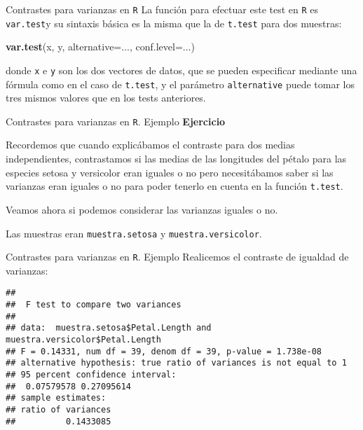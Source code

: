 \documentclass[
  ignorenonframetext,
]{beamer}
\newenvironment{Shaded}{\begin{snugshade}}{\end{snugshade}}
\newcommand{\DataTypeTok}[1]{\textcolor[rgb]{0.13,0.29,0.53}{#1}}
\newcommand{\KeywordTok}[1]{\textcolor[rgb]{0.13,0.29,0.53}{\textbf{#1}}}
\newcommand{\NormalTok}[1]{#1}
\newcommand{\OperatorTok}[1]{\textcolor[rgb]{0.81,0.36,0.00}{\textbf{#1}}}
\begin{document}
\begin{frame}[fragile]{Contrastes para varianzas en \texttt{R}}
\protect\hypertarget{contrastes-para-varianzas-en-r}{}
La función para efectuar este test en \texttt{R} es \texttt{var.test}y
su sintaxis básica es la misma que la de \texttt{t.test} para dos
muestras:

\begin{Shaded}
\begin{Highlighting}[]
\KeywordTok{var.test}\NormalTok{(x, y, }\DataTypeTok{alternative=}\NormalTok{..., }\DataTypeTok{conf.level=}\NormalTok{...)}
\end{Highlighting}
\end{Shaded}

donde \texttt{x} e \texttt{y} son los dos vectores de datos, que se
pueden especificar mediante una fórmula como en el caso de
\texttt{t.test}, y el parámetro \texttt{alternative} puede tomar los
tres mismos valores que en los tests anteriores.
\end{frame}

\begin{frame}[fragile]{Contrastes para varianzas en \texttt{R}. Ejemplo}
\protect\hypertarget{contrastes-para-varianzas-en-r.-ejemplo}{}
\textbf{Ejercicio}

Recordemos que cuando explicábamos el contraste para dos medias
independientes, contrastamos si las medias de las longitudes del pétalo
para las especies setosa y versicolor eran iguales o no pero
necesitábamos saber si las varianzas eran iguales o no para poder
tenerlo en cuenta en la función \texttt{t.test}.

Veamos ahora si podemos considerar las varianzas iguales o no.

Las muestras eran \texttt{muestra.setosa} y \texttt{muestra.versicolor}.
\end{frame}

\begin{frame}[fragile]{Contrastes para varianzas en \texttt{R}. Ejemplo}
\protect\hypertarget{contrastes-para-varianzas-en-r.-ejemplo-1}{}
Realicemos el contraste de igualdad de varianzas:

\begin{Shaded}
\end{Shaded}

\begin{verbatim}
## 
##  F test to compare two variances
## 
## data:  muestra.setosa$Petal.Length and muestra.versicolor$Petal.Length
## F = 0.14331, num df = 39, denom df = 39, p-value = 1.738e-08
## alternative hypothesis: true ratio of variances is not equal to 1
## 95 percent confidence interval:
##  0.07579578 0.27095614
## sample estimates:
## ratio of variances 
##          0.1433085
\end{verbatim}
\end{frame}
\end{document}
